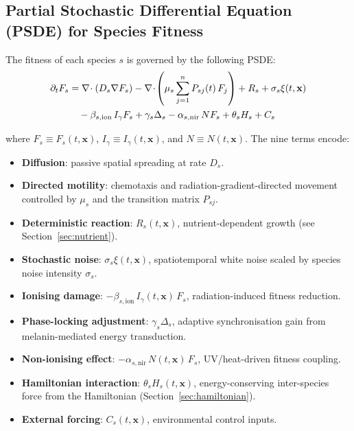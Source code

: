 \documentclass[11pt]{article}
\begin{document}
\subsection{Partial Stochastic Differential Equation (PSDE) for Species Fitness}

The fitness of each species $s$ is governed by the following PSDE:
\begin{align}
\partial_t F_s
  &= \nabla\!\cdot(D_s\nabla F_s)
   - \nabla\!\cdot\!\left(\mu_s\sum_{j=1}^n P_{sj}(t)\,F_j\right)
   + R_s
   + \sigma_s\xi(t,\mathbf{x}) \notag \\
  &\quad
   - \beta_{s,\mathrm{ion}}\,I_\gamma F_s
   + \gamma_s\Delta_s
   - \alpha_{s,\mathrm{nir}}\,N F_s
   + \theta_s H_s
   + C_s
  \label{eq:psde}
\end{align}

\noindent where $F_s \equiv F_s(t,\mathbf{x})$, $I_\gamma \equiv I_\gamma(t,\mathbf{x})$, and
$N \equiv N(t,\mathbf{x})$.  The nine terms encode:
\begin{itemize}\setlength\itemsep{2pt}
  \item \textbf{Diffusion}: passive spatial spreading at rate $D_s$.
  \item \textbf{Directed motility}: chemotaxis and radiation-gradient-directed movement
        controlled by $\mu_s$ and the transition matrix $P_{sj}$.
  \item \textbf{Deterministic reaction}: $R_s(t,\mathbf{x})$, nutrient-dependent growth
        (see Section~\ref{sec:nutrient}).
  \item \textbf{Stochastic noise}: $\sigma_s\xi(t,\mathbf{x})$, spatiotemporal white noise
        scaled by species noise intensity $\sigma_s$.
  \item \textbf{Ionising damage}: $-\beta_{s,\mathrm{ion}}\,I_\gamma(t,\mathbf{x})\,F_s$,
        radiation-induced fitness reduction.
  \item \textbf{Phase-locking adjustment}: $\gamma_s\Delta_s$, adaptive synchronisation gain
        from melanin-mediated energy transduction.
  \item \textbf{Non-ionising effect}: $-\alpha_{s,\mathrm{nir}}\,N(t,\mathbf{x})\,F_s$,
        UV/heat-driven fitness coupling.
  \item \textbf{Hamiltonian interaction}: $\theta_s H_s(t,\mathbf{x})$, energy-conserving
        inter-species force from the Hamiltonian (Section~\ref{sec:hamiltonian}).
  \item \textbf{External forcing}: $C_s(t,\mathbf{x})$, environmental control inputs.
\end{itemize}
\end{document}
